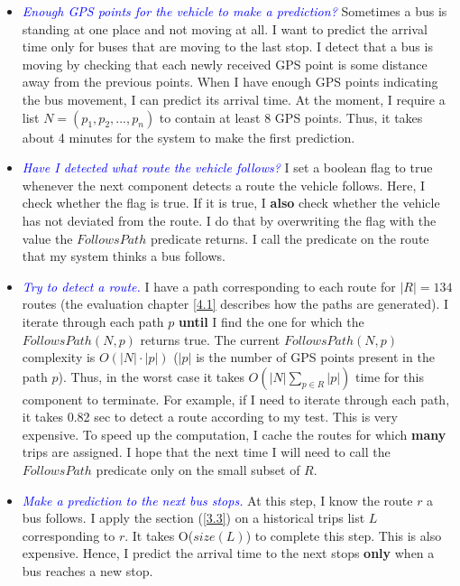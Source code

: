\documentclass[12pt,a4paper,oneside,openright]{report}
\begin{document}
\begin{enumerate}
\begin{itemize}
\item \textit{\textcolor{blue}{Enough GPS points for the vehicle to make a prediction?}} Sometimes
a bus is standing at one place and not moving at all. I want to predict the arrival time only for
buses that are moving to the last stop. I detect that a bus is moving by
checking that each newly received GPS point is some distance away from the previous points. When
I have enough GPS points indicating the bus movement, I can predict its arrival time. At the moment,
I require a list $N = (p_1, p_2, ..., p_n)$ to contain at least 8 GPS points. Thus,
it takes about 4 minutes for the system to make the first prediction.

\item \textit{\textcolor{blue}{Have I detected what route the vehicle follows?}} I set a boolean
flag to true whenever the next component detects a route the vehicle follows. Here, I check
whether the flag is true. If it is true, I \textbf{also} check whether the vehicle has not deviated from the
route. I do that by overwriting the flag with the value the $FollowsPath$ predicate returns. I call the 
predicate on the route that my system thinks a bus follows.

\item \textit{\textcolor{blue}{Try to detect a route.}} I have a path corresponding to each
route for $|R| = 134$ routes (the evaluation chapter \textcolor{blue}{\ref{4.1}} describes
how the paths are generated). I iterate through each path $p$ \textbf{until} I find the one for
which the $FollowsPath(N, p)$ returns true. The current $FollowsPath(N, p)$ complexity is
$O(|N| \cdot |p|)$ ($|p|$ is the number of GPS points present in the path $p$). Thus,
in the worst case it takes $O(|N| \sum\nolimits_{p \in R} |p|)$ time for this component to terminate.
For example, if I need to iterate through each path, it takes 0.82 sec to detect a route according to my test.
This is very expensive. To speed up the computation, I cache the routes for
which \textbf{many} trips are assigned. I hope that the next time I will need to call the $FollowsPath$
predicate only on the small subset of $R$.

\item \textit{\textcolor{blue}{Make a prediction to the next bus stops.}} At this step, 
I know the route $r$ a bus follows. I apply the section (\textcolor{blue}{\ref{3.3}}) on a
historical trips list $L$ corresponding to $r$.
It takes O($size(L)$) to complete this step. This is also expensive. Hence, I predict the arrival
time to the next stops \textbf{only} when a bus reaches a new stop.


\end{itemize}
\end{enumerate}
\end{document}

